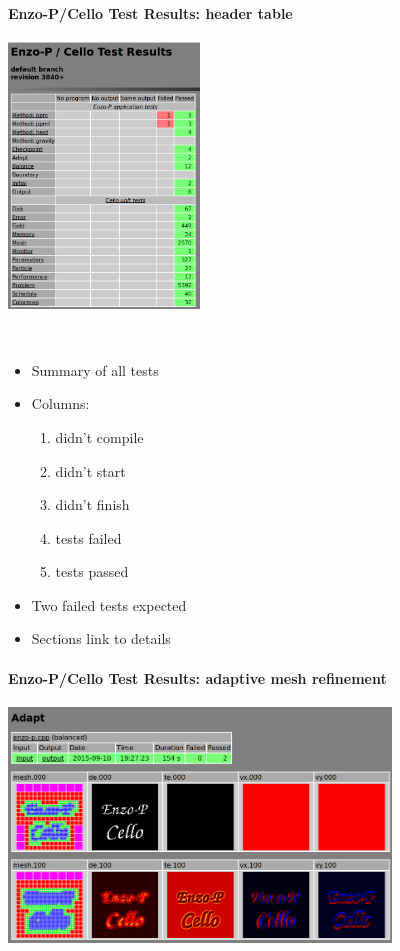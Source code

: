 \begin{frame}[fragile] 
\secframetitle{\ssTesting}
\framesubtitle{Enzo-P/Cello Test Results: header table}
\begin{minipage}{2.0in}
\includegraphics[width=2.0in]{Images/cello-test.png}
\end{minipage} \ 
\begin{minipage}{2.0in}
\begin{itemize}
\item Summary of all tests
\item Columns:
\footnotesize
\begin{enumerate}
\item didn't compile
\item didn't start
\item didn't finish
\item tests failed
\item tests passed
\end{enumerate}
\small
\item Two failed tests expected
\item Sections link to details
\end{itemize}
\end{minipage}
\end{frame}


\begin{frame}[fragile] 
\secframetitle{\ssTesting}
\framesubtitle{Enzo-P/Cello Test Results: adaptive mesh refinement}
\includegraphics[width=4.0in]{Images/cello-test-2.png}
\end{frame}


